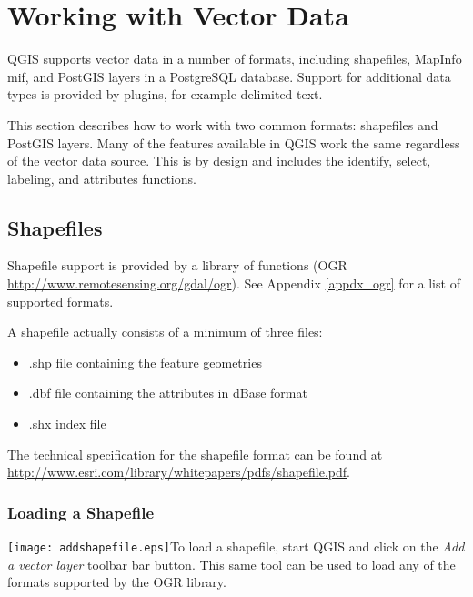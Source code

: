 
\section{Working with Vector Data}\label{label_workingvector}

QGIS supports vector data in a number of formats, including shapefiles,
MapInfo mif, and PostGIS layers in a PostgreSQL database.
Support for
additional data types is provided by plugins, for example delimited
text.

This section describes how to work with two common formats:
shapefiles and PostGIS layers. Many of the
features available in QGIS work the same regardless of the vector data source.
This is by design and includes the identify, select, labeling, and attributes
functions.

\subsection{Shapefiles}

Shapefile support is provided by a library of functions (OGR
\url{http://www.remotesensing.org/gdal/ogr}). See Appendix
\ref{appdx_ogr} for a list of supported formats.

A shapefile actually consists of a minimum of three
files:

\begin{itemize}
\item .shp file containing the feature geometries
\item .dbf file containing the attributes in dBase format
\item .shx index file
\end{itemize}

The technical specification for the shapefile format can be found at\\
\url{http://www.esri.com/library/whitepapers/pdfs/shapefile.pdf}.

\subsubsection{Loading a Shapefile}
{\texttt{[image: addshapefile.eps]}}To load a shapefile, start
QGIS and click on the \textit{Add a vector layer}
toolbar bar button. This same tool can be used to
load any of the formats supported by the OGR library.

